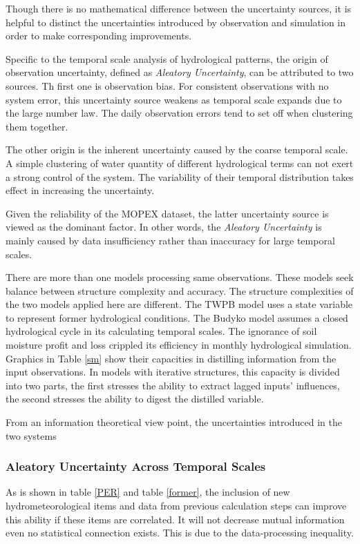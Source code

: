 \documentclass[draft,wrr]{AGUTeX}
\begin{document}
\begin{article}
Though there is no mathematical difference between the uncertainty sources, it is helpful to distinct the uncertainties introduced by observation and simulation in order to make corresponding improvements\citep{gong2013estimating}. 

Specific to the temporal scale analysis of hydrological patterns, the origin of observation uncertainty, defined as \emph{Aleatory Uncertainty}, can be attributed to two sources. Th first one is  observation bias. For consistent observations with no system error, this uncertainty source  weakens as temporal scale expands  due to the large number law. The daily observation errors tend to set off when clustering them together. 

The other origin is the inherent uncertainty caused by the coarse temporal scale. A simple clustering of water quantity of different hydrological terms can not exert a strong control of the system. The variability of their temporal distribution takes effect in increasing the uncertainty. 

Given the reliability of the MOPEX dataset, the latter uncertainty source is viewed as the dominant factor. In other words, the \emph{Aleatory Uncertainty} is mainly caused by data insufficiency rather than inaccuracy for large temporal scales.

There are more than one models processing same observations. These models seek balance between structure complexity and accuracy. The structure complexities of the two models applied here are different. The TWPB model uses a state variable to represent former hydrological conditions. The Budyko model assumes a closed hydrological cycle in its calculating temporal scales. The ignorance of soil moisture profit and loss crippled its efficiency in monthly hydrological simulation. Graphics in Table \ref{sm} show their capacities in distilling information from the input observations. In models with iterative structures, this capacity is divided into two parts, the first stresses the ability to extract lagged inputs' influences, the second stresses the ability to digest the distilled variable. 






\iffalse
From an information theoretical view point, the uncertainties introduced in the two systems   
\subsubsection{Aleatory Uncertainty Across Temporal Scales}
As is shown in table \ref{PER} and table \ref{former}, the inclusion of new hydrometeorological items and data from previous calculation steps can improve this ability if these items are correlated. It will not decrease mutual information even no statistical connection exists. This is due to the data-processing inequality\citep{cover2012elements}.  


\end{article}
\end{document}

